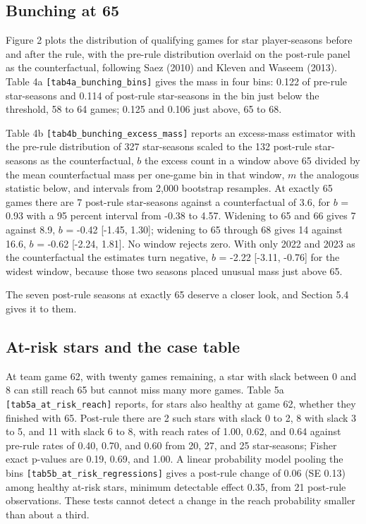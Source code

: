 \documentclass[11pt]{article}
\begin{document}
\subsection*{Bunching at 65}


Figure 2 plots the distribution of qualifying games for star player-seasons before and after the rule, with the pre-rule distribution overlaid on the post-rule panel as the counterfactual, following Saez (2010) and Kleven and Waseem (2013). Table 4a {\small\texttt{[tab4a\_bunching\_bins]}} gives the mass in four bins: 0.122 of pre-rule star-seasons and 0.114 of post-rule star-seasons in the bin just below the threshold, 58 to 64 games; 0.125 and 0.106 just above, 65 to 68.

Table 4b {\small\texttt{[tab4b\_bunching\_excess\_mass]}} reports an excess-mass estimator with the pre-rule distribution of 327 star-seasons scaled to the 132 post-rule star-seasons as the counterfactual, $b$ the excess count in a window above 65 divided by the mean counterfactual mass per one-game bin in that window, $m$ the analogous statistic below, and intervals from 2,000 bootstrap resamples. At exactly 65 games there are 7 post-rule star-seasons against a counterfactual of 3.6, for $b$ = 0.93 with a 95 percent interval from -0.38 to 4.57. Widening to 65 and 66 gives 7 against 8.9, $b$ = -0.42 [-1.45, 1.30]; widening to 65 through 68 gives 14 against 16.6, $b$ = -0.62 [-2.24, 1.81]. No window rejects zero. With only 2022 and 2023 as the counterfactual the estimates turn negative, $b$ = -2.22 [-3.11, -0.76] for the widest window, because those two seasons placed unusual mass just above 65.

The seven post-rule seasons at exactly 65 deserve a closer look, and Section 5.4 gives it to them.


\subsection*{At-risk stars and the case table}


At team game 62, with twenty games remaining, a star with slack between 0 and 8 can still reach 65 but cannot miss many more games. Table 5a {\small\texttt{[tab5a\_at\_risk\_reach]}} reports, for stars also healthy at game 62, whether they finished with 65. Post-rule there are 2 such stars with slack 0 to 2, 8 with slack 3 to 5, and 11 with slack 6 to 8, with reach rates of 1.00, 0.62, and 0.64 against pre-rule rates of 0.40, 0.70, and 0.60 from 20, 27, and 25 star-seasons; Fisher exact p-values are 0.19, 0.69, and 1.00. A linear probability model pooling the bins {\small\texttt{[tab5b\_at\_risk\_regressions]}} gives a post-rule change of 0.06 (SE 0.13) among healthy at-risk stars, minimum detectable effect 0.35, from 21 post-rule observations. These tests cannot detect a change in the reach probability smaller than about a third.
\end{document}
